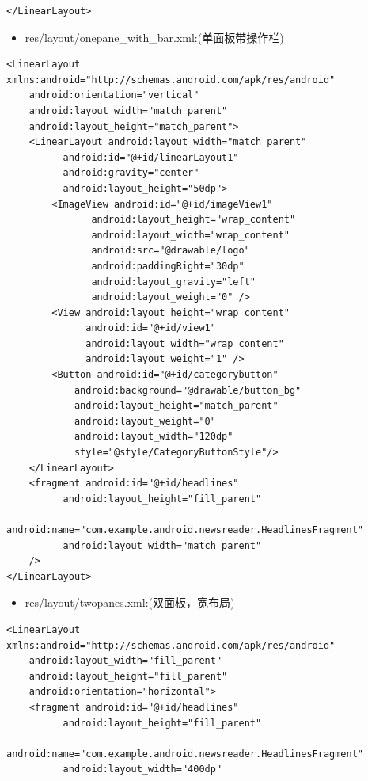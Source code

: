 \documentclass[9pt, b5paper]{article}
\begin{document}
\begin{enumerate}
\begin{enumerate}
\begin{enumerate}
\begin{itemize}
\begin{verbatim}
</LinearLayout>
\end{verbatim}
\begin{itemize}
\item res/layout/onepane\_with\_bar.xml:(单面板带操作栏)
\end{itemize}
\begin{verbatim}
<LinearLayout xmlns:android="http://schemas.android.com/apk/res/android"  
    android:orientation="vertical"  
    android:layout_width="match_parent"  
    android:layout_height="match_parent">  
    <LinearLayout android:layout_width="match_parent"   
          android:id="@+id/linearLayout1"    
          android:gravity="center"  
          android:layout_height="50dp">  
        <ImageView android:id="@+id/imageView1"   
               android:layout_height="wrap_content"  
               android:layout_width="wrap_content"  
               android:src="@drawable/logo"  
               android:paddingRight="30dp"  
               android:layout_gravity="left"  
               android:layout_weight="0" />  
        <View android:layout_height="wrap_content"   
              android:id="@+id/view1"  
              android:layout_width="wrap_content"  
              android:layout_weight="1" />  
        <Button android:id="@+id/categorybutton"  
            android:background="@drawable/button_bg"  
            android:layout_height="match_parent"  
            android:layout_weight="0"  
            android:layout_width="120dp"  
            style="@style/CategoryButtonStyle"/>  
    </LinearLayout>  
    <fragment android:id="@+id/headlines"   
          android:layout_height="fill_parent"  
          android:name="com.example.android.newsreader.HeadlinesFragment"  
          android:layout_width="match_parent" 
    />  
</LinearLayout>
\end{verbatim}
\begin{itemize}
\item res/layout/twopanes.xml:(双面板，宽布局)
\end{itemize}
\begin{verbatim}
<LinearLayout xmlns:android="http://schemas.android.com/apk/res/android"
    android:layout_width="fill_parent"
    android:layout_height="fill_parent"
    android:orientation="horizontal">
    <fragment android:id="@+id/headlines"
          android:layout_height="fill_parent"
          android:name="com.example.android.newsreader.HeadlinesFragment"
          android:layout_width="400dp"

\end{verbatim}
\end{itemize}
\end{enumerate}
\end{enumerate}
\end{enumerate}
\end{document}
